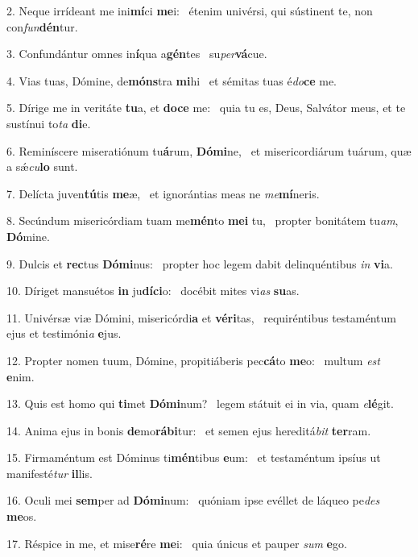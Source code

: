2. Neque irrídeant me ini\textbf{mí}ci \textbf{me}i: \ast\  étenim univérsi, qui sústinent te, non con\textit{fun}\textbf{dén}tur.\

3. Confundántur omnes in\textbf{í}qua a\textbf{gén}tes \ast\  su\textit{per}\textbf{vá}cue.\

4. Vias tuas, Dómine, de\textbf{móns}tra \textbf{mi}hi \ast\  et sémitas tuas é\textit{do}\textbf{ce} me.\

5. Dírige me in veritáte \textbf{tu}a, et \textbf{do}\textbf{ce} me: \ast\  quia tu es, Deus, Salvátor meus, et te sustínui to\textit{ta} \textbf{di}e.\

6. Reminíscere miseratiónum tu\textbf{á}rum, \textbf{Dó}\textbf{mi}ne, \ast\  et misericordiárum tuárum, quæ a sǽ\textit{cu}\textbf{lo} sunt.\

7. Delícta juven\textbf{tú}tis \textbf{me}æ, \ast\  et ignorántias meas ne \textit{me}\textbf{mí}neris.\

8. Secúndum misericórdiam tuam me\textbf{mén}to \textbf{me}\textbf{i} tu, \ast\  propter bonitátem tu\textit{am}, \textbf{Dó}mine.\

9. Dulcis et \textbf{rec}tus \textbf{Dó}\textbf{mi}nus: \ast\  propter hoc legem dabit delinquéntibus \textit{in} \textbf{vi}a.\

10. Díriget mansuétos \textbf{in} ju\textbf{dí}\textbf{ci}o: \ast\  docébit mites vi\textit{as} \textbf{su}as.\

11. Univérsæ viæ Dómini, misericórdi\textbf{a} et \textbf{vé}\textbf{ri}tas, \ast\  requiréntibus testaméntum ejus et testimóni\textit{a} \textbf{e}jus.\

12. Propter nomen tuum, Dómine, propitiáberis pec\textbf{cá}to \textbf{me}o: \ast\  multum \textit{est} \textbf{e}nim.\

13. Quis est homo qui \textbf{ti}met \textbf{Dó}\textbf{mi}num? \ast\  legem státuit ei in via, quam \textit{e}\textbf{lé}git.\

14. Anima ejus in bonis \textbf{de}mo\textbf{rá}\textbf{bi}tur: \ast\  et semen ejus hereditá\textit{bit} \textbf{ter}ram.\

15. Firmaméntum est Dóminus ti\textbf{mén}tibus \textbf{e}um: \ast\  et testaméntum ipsíus ut manifesté\textit{tur} \textbf{il}lis.\

16. Oculi mei \textbf{sem}per ad \textbf{Dó}\textbf{mi}num: \ast\  quóniam ipse evéllet de láqueo pe\textit{des} \textbf{me}os.\

17. Réspice in me, et mise\textbf{ré}re \textbf{me}i: \ast\  quia únicus et pauper \textit{sum} \textbf{e}go.\

